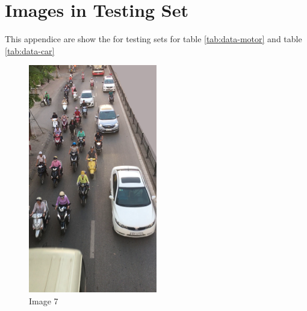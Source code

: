 \chapter{Images in Testing Set}
\label{app:01}
This appendice are show the for testing sets for table \ref{tab:data-motor} and table \ref{tab:data-car}
\begin{center}
    \begin{figure}[H]
        \centering
      \includegraphics[width=0.5\textwidth]{Chapters/Fig/07}
      \caption{Image 7}
      \label{fig:img07}
  \end{figure}
\end{center}


